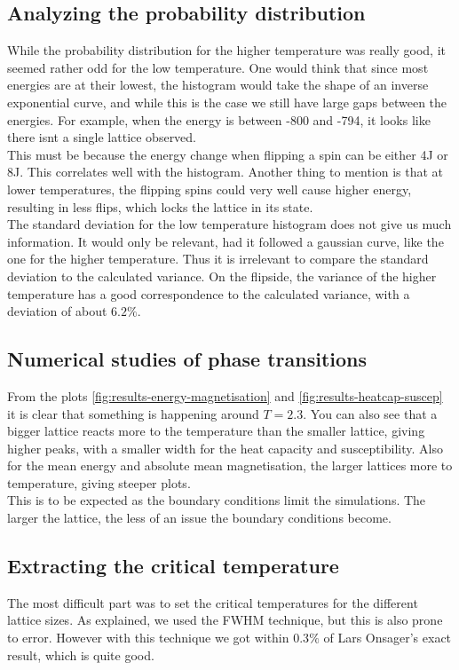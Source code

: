 \documentclass[../main.tex]{subfiles}
\begin{document}
\subsection{Analyzing the probability distribution}
While the probability distribution for the higher temperature was really good, it seemed rather odd for the low temperature. One would think that since most energies are at their lowest, the histogram would take the shape of an inverse exponential curve, and while this is the case we still have large gaps between the energies. For example, when the energy is between -800 and -794, it looks like there isnt a single lattice observed. \\
This must be because the energy change when flipping a spin can be either 4J or 8J. This correlates well with the histogram. Another thing to mention is that at lower temperatures, the flipping spins could very well cause higher energy, resulting in less flips, which locks the lattice in its state. \\
The standard deviation for the low temperature histogram does not give us much information. It would only be relevant, had it followed a gaussian curve, like the one for the higher temperature. Thus it is irrelevant to compare the standard deviation to the calculated variance. On the flipside, the variance of the higher temperature has a good correspondence to the calculated variance, with a deviation of about $6.2\%$.

\subsection{Numerical studies of phase transitions}
From the plots \ref{fig:results-energy-magnetisation} and \ref{fig:results-heatcap-suscep} it is clear that something is happening around $T = 2.3$. You can also see that a bigger lattice reacts more to the temperature than the smaller lattice, giving higher peaks, with a smaller width for the heat capacity and susceptibility. Also for the mean energy and absolute mean magnetisation, the larger lattices  more to temperature, giving steeper plots.\\
This is to be expected as the boundary conditions limit the simulations. The larger the lattice, the less of an issue the boundary conditions become.

\subsection{Extracting the critical temperature}
The most difficult part was to set the critical temperatures for the different lattice sizes. As explained, we used the FWHM technique, but this is also prone to error. However with this technique we got within $0.3\%$ of Lars Onsager's exact result, which is quite good.
\end{document}
